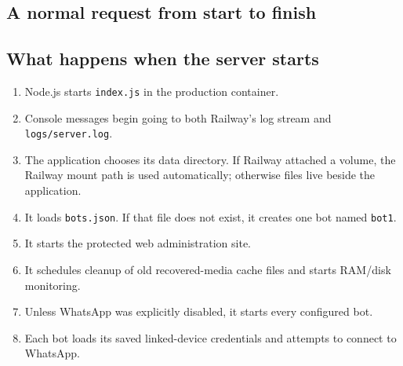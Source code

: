 \documentclass[11pt,a4paper]{article}
\begin{document}
\subsection{A normal request from start to finish}

\begin{center}
\end{center}

\subsection{What happens when the server starts}

\begin{enumerate}
  \item Node.js starts \texttt{index.js} in the production container.
  \item Console messages begin going to both Railway's log stream and \texttt{logs/server.log}.
  \item The application chooses its data directory. If Railway attached a volume, the Railway mount path is used automatically; otherwise files live beside the application.
  \item It loads \texttt{bots.json}. If that file does not exist, it creates one bot named \texttt{bot1}.
  \item It starts the protected web administration site.
  \item It schedules cleanup of old recovered-media cache files and starts RAM/disk monitoring.
  \item Unless WhatsApp was explicitly disabled, it starts every configured bot.
  \item Each bot loads its saved linked-device credentials and attempts to connect to WhatsApp.
\end{enumerate}
\end{document}
